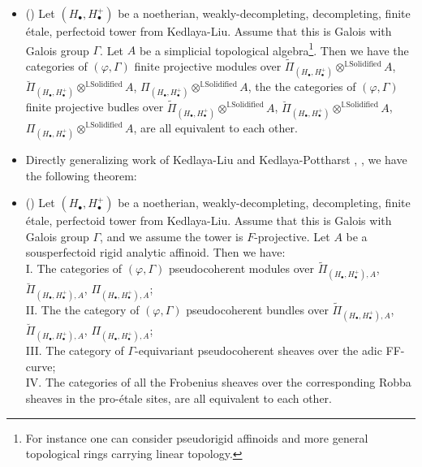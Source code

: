 \documentclass[11pt]{report}
\begin{document}









\begin{itemize}
\justifying
\item<4-> ()
Let $(H_\bullet,H_\bullet^+)$ be a noetherian, weakly-decompleting, decompleting, finite \'etale, perfectoid tower from Kedlaya-Liu. Assume that this is Galois with Galois group $\Gamma$. Let $A$ be a simplicial topological algebra\footnote{For instance one can consider pseudorigid affinoids and more general topological rings carrying linear topology.}. Then we have the categories of $(\varphi,\Gamma)$ finite projective modules over $\widetilde{\Pi}_{(H_\bullet,H_\bullet^+)}\otimes^{\mathbb{L}\mathrm{Solidified}}A$, $\breve{\Pi}_{(H_\bullet,H_\bullet^+)}\otimes^{\mathbb{L}\mathrm{Solidified}}A$, ${\Pi}_{(H_\bullet,H_\bullet^+)}\otimes^{\mathbb{L}\mathrm{Solidified}}A$, the the categories of $(\varphi,\Gamma)$ finite projective budles over $\widetilde{\Pi}_{(H_\bullet,H_\bullet^+)}\otimes^{\mathbb{L}\mathrm{Solidified}}A$, $\breve{\Pi}_{(H_\bullet,H_\bullet^+)}\otimes^{\mathbb{L}\mathrm{Solidified}}A$, ${\Pi}_{(H_\bullet,H_\bullet^+)}\otimes^{\mathbb{L}\mathrm{Solidified}}A$, are all equivalent to each other.	
\item<5-> Directly generalizing work of Kedlaya-Liu and Kedlaya-Pottharst \cite{KL1}, \cite{KL2}, \cite{KP} we have the following theorem:

\item<6-> ()
Let $(H_\bullet,H_\bullet^+)$ be a noetherian, weakly-decompleting, decompleting, finite \'etale, perfectoid tower from Kedlaya-Liu. Assume that this is Galois with Galois group $\Gamma$, and we assume the tower is $F$-projective. Let $A$ be a sousperfectoid rigid analytic affinoid. Then we have:\\
I. The categories of $(\varphi,\Gamma)$ pseudocoherent modules over $\widetilde{\Pi}_{(H_\bullet,H_\bullet^+),A}$, $\breve{\Pi}_{(H_\bullet,H_\bullet^+),A}$, ${\Pi}_{(H_\bullet,H_\bullet^+),A}$;\\ 
II. The the category of $(\varphi,\Gamma)$ pseudocoherent bundles over $\widetilde{\Pi}_{(H_\bullet,H_\bullet^+),A}$, $\breve{\Pi}_{(H_\bullet,H_\bullet^+),A}$, ${\Pi}_{(H_\bullet,H_\bullet^+),A}$;\\ 
III. The category of $\Gamma$-equivariant pseudocoherent sheaves over the adic FF-curve;\\
IV. The categories of all the Frobenius sheaves over the corresponding Robba sheaves in the pro-\'etale sites, are all equivalent to each other.

	
\end{itemize}
	
\end{document}
